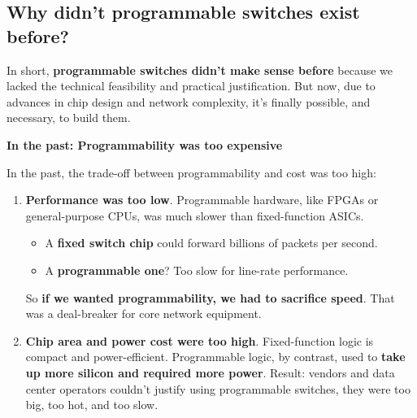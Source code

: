 \subsection{Why didn't programmable switches exist before?}

In short, \textbf{programmable switches didn't make sense before} because we lacked the technical feasibility and practical justification. But now, due to advances in chip design and network complexity, it's finally possible, and necessary, to build them.

\highspace
\begin{flushleft}
    \textcolor{Red2}{ \textbf{In the past: Programmability was too expensive}}
\end{flushleft}
In the past, the trade-off between programmability and cost was too high:
\begin{enumerate}
    \item \textcolor{Red2}{\textbf{Performance was too low}}. Programmable hardware, like FPGAs or general-purpose CPUs, was much slower than fixed-function ASICs.
    \begin{itemize}
        \item[\textcolor{Green3}{\faIcon{check}}] A \textbf{fixed switch chip} could forward billions of packets per second.
        \item[\textcolor{Red2}{\faIcon{times}}] A \textbf{programmable one}? Too slow for line-rate performance.
    \end{itemize}
    So \textbf{if we wanted programmability, we had to sacrifice speed}. That was a deal-breaker for core network equipment.


    \item \textcolor{Red2}{\textbf{Chip area and power cost were too high}}. Fixed-function logic is compact and power-efficient. Programmable logic, by contrast, used to \textbf{take up more silicon and required more power}. Result: vendors and data center operators couldn't justify using programmable switches, they were too big, too hot, and too slow.
\end{enumerate}

